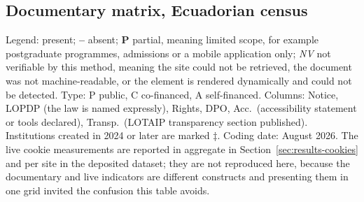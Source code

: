 \documentclass[pdflatex,sn-basic,Numbered]{sn-jnl}
\newcommand{\si}{\ding{51}}
\newcommand{\no}{\textcolor{gris}{\textbf{--}}}
\newcommand{\nv}{\textsl{\footnotesize NV}}
\theoremstyle{thmstyleone}
\theoremstyle{thmstyletwo}
\theoremstyle{thmstylethree}
\begin{document}
\begin{appendices}
\section{Documentary matrix, Ecuadorian census}\label{ap:ecuador}
\setcounter{table}{0}\setcounter{figure}{0}

Legend: \si{} present; \no{} absent; \textbf{P} partial, meaning limited scope, for example postgraduate programmes, admissions or a mobile application only; \nv{} not verifiable by this method, meaning the site could not be retrieved, the document was not machine-readable, or the element is rendered dynamically and could not be detected. Type: P public, C co-financed, A self-financed. Columns: Notice, LOPDP (the law is named expressly), Rights, DPO, Acc.\ (accessibility statement or tools declared), Transp.\ (LOTAIP transparency section published). Institutions created in 2024 or later are marked $\ddagger$. Coding date: August 2026. The live cookie measurements are reported in aggregate in Section~\ref{sec:results-cookies} and per site in the deposited dataset; they are not reproduced here, because the documentary and live indicators are different constructs and presenting them in one grid invited the confusion this table avoids.


\end{appendices}
\end{document}
